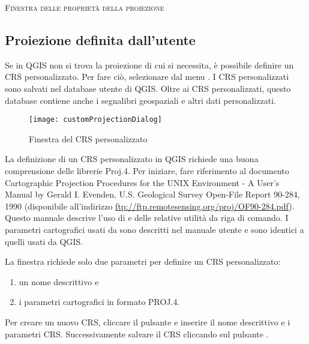 \begin{Tip}
 \caption{\textsc{Finestra delle proprietà della proiezione}}
\end{Tip}

\subsection{Proiezione definita dall'utente}\label{sec:customprojections}

Se in QGIS non si trova la proiezione di cui si necessita, è possibile
definire un CRS personalizzato. Per fare ciò, selezionare
 dal menu
. I CRS personalizzati sono salvati nel database
utente di QGIS. Oltre ai CRS personalizzati, questo database contiene anche i
segnalibri geospaziali e altri dati personalizzati. 

\begin{figure}[ht]
   \begin{center}
   \caption{Finestra del CRS personalizzato \nixcaption}\label{fig:customprojections}\smallskip
   \texttt{[image: customProjectionDialog]}
\end{center}  
\end{figure}

La definizione di un CRS personalizzato in QGIS richiede una buona
comprensione delle librerie Proj.4. Per iniziare, fare riferimento al
documento Cartographic Projection Procedures for the UNIX Environment - A User's Manual
by Gerald I. Evenden, U.S. Geological Survey Open-File Report 90-284, 1990
(disponibile all'indirizzo \url{ftp://ftp.remotesensing.org/proj/OF90-284.pdf}).
Questo manuale descrive l'uso di  e delle relative utilità da
riga di comando. I parametri cartografici usati da  sono
descritti nel manuale utente e sono identici a quelli usati da QGIS. 

La finestra 
richiede solo due parametri per definire un CRS personalizzato: 
\begin{enumerate}
\item un nome descrittivo e
\item i parametri cartografici in formato PROJ.4.
\end{enumerate}
Per creare un nuovo CRS, cliccare il pulsante  e
inserire il nome descrittivo e i parametri CRS. Successivamente salvare il CRS
cliccando sul pulsante .

